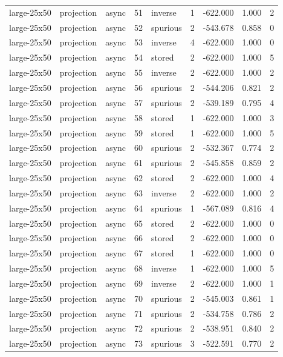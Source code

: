 \begin{tabular}{lllrlrrrr}
large-25x50 & projection & async & 51 & inverse & 1 & -622.000 & 1.000 & 2 \\
large-25x50 & projection & async & 52 & spurious & 2 & -543.678 & 0.858 & 0 \\
large-25x50 & projection & async & 53 & inverse & 4 & -622.000 & 1.000 & 0 \\
large-25x50 & projection & async & 54 & stored & 2 & -622.000 & 1.000 & 5 \\
large-25x50 & projection & async & 55 & inverse & 2 & -622.000 & 1.000 & 2 \\
large-25x50 & projection & async & 56 & spurious & 2 & -544.206 & 0.821 & 2 \\
large-25x50 & projection & async & 57 & spurious & 2 & -539.189 & 0.795 & 4 \\
large-25x50 & projection & async & 58 & stored & 1 & -622.000 & 1.000 & 3 \\
large-25x50 & projection & async & 59 & stored & 1 & -622.000 & 1.000 & 5 \\
large-25x50 & projection & async & 60 & spurious & 2 & -532.367 & 0.774 & 2 \\
large-25x50 & projection & async & 61 & spurious & 2 & -545.858 & 0.859 & 2 \\
large-25x50 & projection & async & 62 & stored & 2 & -622.000 & 1.000 & 4 \\
large-25x50 & projection & async & 63 & inverse & 2 & -622.000 & 1.000 & 2 \\
large-25x50 & projection & async & 64 & spurious & 1 & -567.089 & 0.816 & 4 \\
large-25x50 & projection & async & 65 & stored & 2 & -622.000 & 1.000 & 0 \\
large-25x50 & projection & async & 66 & stored & 2 & -622.000 & 1.000 & 0 \\
large-25x50 & projection & async & 67 & stored & 1 & -622.000 & 1.000 & 0 \\
large-25x50 & projection & async & 68 & inverse & 1 & -622.000 & 1.000 & 5 \\
large-25x50 & projection & async & 69 & inverse & 2 & -622.000 & 1.000 & 1 \\
large-25x50 & projection & async & 70 & spurious & 2 & -545.003 & 0.861 & 1 \\
large-25x50 & projection & async & 71 & spurious & 2 & -534.758 & 0.786 & 2 \\
large-25x50 & projection & async & 72 & spurious & 2 & -538.951 & 0.840 & 2 \\
large-25x50 & projection & async & 73 & spurious & 3 & -522.591 & 0.770 & 2 \\

\end{tabular}

